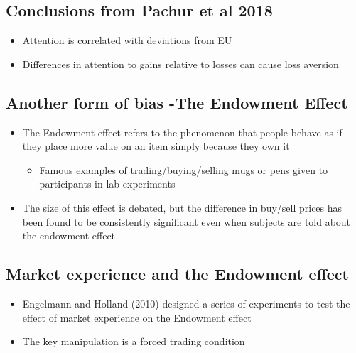 \subsection{Conclusions from Pachur et al 2018}
\begin{itemize}
    \item Attention is correlated with deviations from EU
    \item Differences in attention to gains relative to losses can cause loss aversion
\end{itemize}
\subsection{Another form of bias -The Endowment Effect}
\begin{itemize}
    \item The Endowment effect refers to the phenomenon that people behave as if they place more value on an item simply because they own it
    \begin{itemize}
        \item Famous examples of trading/buying/selling mugs or pens given to participants in lab experiments
    \end{itemize}
    \item The size of this effect is debated, but the difference in buy/sell prices has been found to be consistently significant even when subjects are told about the endowment effect
\end{itemize}
\subsection{Market experience and the Endowment effect}
\begin{itemize}
    \item Engelmann and Holland (2010) designed a series of experiments to test the effect of market experience on the Endowment effect
    \item The key manipulation is a forced trading condition
\end{itemize}
